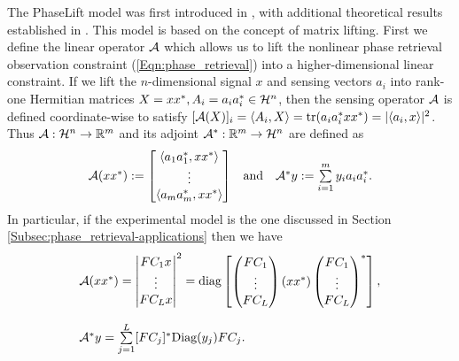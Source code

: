 The PhaseLift model was first introduced in \cite{DBLP:journals/siamis/CandesESV13}, with additional theoretical results established in \cite{candes2013phaselift}.  This model is based on the concept of matrix lifting.  First we define the linear operator ${\mathcal A}$ which allows us to lift the nonlinear phase retrieval observation constraint (\ref{Eqn:phase_retrieval}) into a higher-dimensional linear constraint.  If we lift the $n$-dimensional signal $x$ and sensing vectors $a_i$ into rank-one Hermitian matrices $X = xx^*, A_i = a_ia_i^* \in {\mathcal H}^n$, then the sensing operator ${\mathcal A}$ is defined coordinate-wise to satisfy $[{\mathcal A} (X)]_i = \langle A_i, X \rangle = \mathrm{tr}( a_i a_i^* xx^* )= | \langle a_i, x \rangle |^2$.  Thus ${\mathcal A}: {\mathcal H}^n \rightarrow {\mathbb R}^m$ and its adjoint ${\mathcal A}^* : {\mathbb R}^m \rightarrow {\mathcal H}^n$ are defined as
\begin{equation} 			\label{Eqn:A_definition}
\begin{array}{lcr}
{\mathcal A}(xx^*)
	:= \begin{bmatrix} \langle a_1 a_1^*, xx^* \rangle \\ \vdots \\ \langle a_m a_m^*, xx^* \rangle \end{bmatrix}
		
	& 	\text{and}
		&	{\mathcal A}^*y
			  := \sum\limits_{\substack{i = 1}}^{\substack{m}} y_ia_ia_i^*.
\end{array}
\end{equation}
In particular, if the experimental model is the one discussed in Section \ref{Subsec:phase_retrieval-applications} then we have
\begin{equation} 			\label{Eqn:A_definition_with_masks}
\begin{array}{l}
{\mathcal A}(xx^*)
		= \begin{vmatrix}
				FC_1x \\ \vdots \\ FC_Lx
			\end{vmatrix}^2
			= \textnormal{diag}\begin{bmatrix}
			\begin{pmatrix}
			FC_1 \\ \vdots \\ FC_L
			\end{pmatrix}
		 	(xx^*)
	 		\begin{pmatrix}
			FC_1 \\ \vdots \\ FC_L
		 	\end{pmatrix}^*
		\end{bmatrix},
									\\
									\\
{\mathcal A}^*y
			  =\sum\limits_{\substack{j=1}}^{\substack{L}}
					[FC_j]^* \textnormal{Diag}(y_j) F C_j.
\end{array}
\end{equation}






